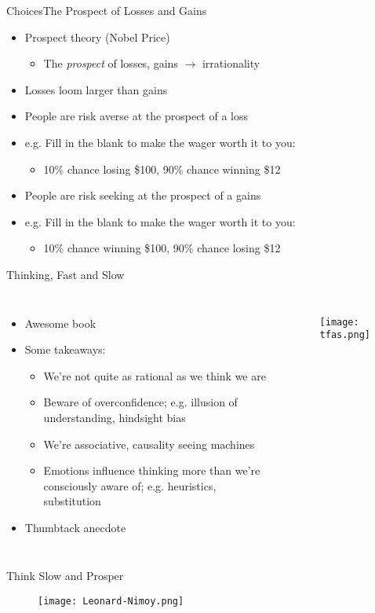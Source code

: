 \documentclass{beamer}
\begin{document}
\begin{frame}{Choices}{The Prospect of Losses and Gains}

  \begin{itemize}
  \addtolength{\itemsep}{0.5\baselineskip}
  \item Prospect theory (Nobel Price) 
        \begin{itemize}
        \item The {\it prospect} of losses, gains $\rightarrow$ irrationality
        \end{itemize}
  \item Losses loom larger than gains
  \item People are risk averse at the prospect of a loss
  \item e.g. Fill in the blank to make the wager worth it to you:
        \begin{itemize}
        \item 10\% chance losing \$100, 90\% chance winning \$12
        \end{itemize}
  \item People are risk seeking at the prospect of a gains
  \item e.g. Fill in the blank to make the wager worth it to you:
        \begin{itemize}
        \item 10\% chance winning \$100, 90\% chance losing \$12
        \end{itemize}
  \end{itemize}

\end{frame}


\begin{frame}{Thinking, Fast and Slow}{}
\begin{columns}
\begin{itemize}
\addtolength{\itemsep}{0.5\baselineskip}
\item Awesome book
\item Some takeaways: 
  \begin{itemize}
  \addtolength{\itemsep}{0.5\baselineskip}
  \item We're not quite as rational as we think we are
  \item Beware of overconfidence; e.g. illusion of understanding, hindsight bias 
  \item We're associative, causality seeing machines
  \item Emotions influence thinking more than we're consciously aware of; e.g. heuristics, substitution 
  \end{itemize}
  \item Thumbtack anecdote
\end{itemize}
    \begin{figure}[H]
  	\centering
  	\texttt{[image: tfas.png]}
  	\end{figure}
\end{columns}
\end{frame}

\begin{frame}{Think Slow and Prosper}{}
    \begin{figure}[H]
  	\centering
  	\texttt{[image: Leonard-Nimoy.png]}
  	\end{figure}
\end{frame}
\end{document}
